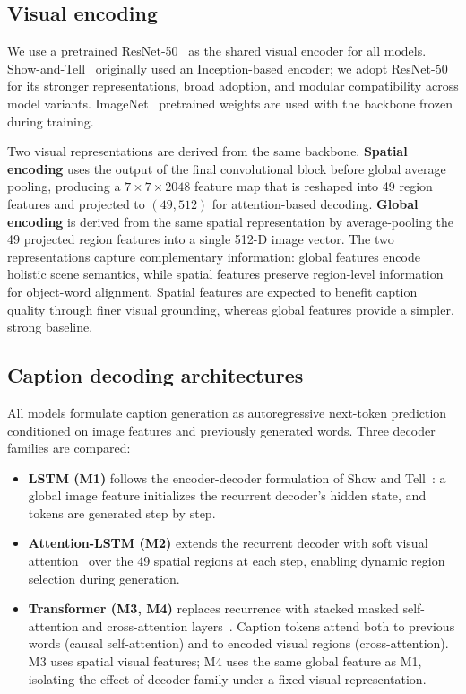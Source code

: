 \documentclass[10pt,twocolumn,letterpaper]{article}
\begin{document}
\subsection{Visual encoding}
We use a pretrained ResNet-50~\cite{he2016deep} as the shared visual
encoder for all models. Show-and-Tell~\cite{vinyals2015show} originally
used an Inception-based encoder; we adopt ResNet-50 for its stronger
representations, broad adoption, and modular compatibility across model
variants. ImageNet~\cite{deng2009imagenet} pretrained weights are used
with the backbone frozen during training.

Two visual representations are derived from the same backbone.
\textbf{Spatial encoding} uses the output of the final convolutional
block before global average pooling, producing a $7\times 7\times 2048$
feature map that is reshaped into 49 region features and projected to
$(49, 512)$ for attention-based decoding. \textbf{Global encoding} is
derived from the same spatial representation by average-pooling the 49
projected region features into a single 512-D image vector. The two
representations capture complementary information: global features
encode holistic scene semantics, while spatial features preserve
region-level information for object-word alignment. Spatial features
are expected to benefit caption quality through finer visual grounding,
whereas global features provide a simpler, strong baseline.

\subsection{Caption decoding architectures}
All models formulate caption generation as autoregressive
next-token prediction conditioned on image features and previously
generated words. Three decoder families are compared:

\begin{itemize}
    \item \textbf{LSTM (M1)} follows the encoder-decoder formulation
    of Show and Tell~\cite{vinyals2015show}: a global image feature
    initializes the recurrent decoder's hidden state, and tokens are
    generated step by step.
    \item \textbf{Attention-LSTM (M2)} extends the recurrent decoder
    with soft visual attention~\cite{xu2015show} over the 49 spatial
    regions at each step, enabling dynamic region selection during
    generation.
    \item \textbf{Transformer (M3, M4)} replaces recurrence with stacked
    masked self-attention and cross-attention layers~\cite{vaswani2017attention}.
    Caption tokens attend both to previous words (causal self-attention)
    and to encoded visual regions (cross-attention). M3 uses spatial
    visual features; M4 uses the same global feature as M1, isolating
    the effect of decoder family under a fixed visual representation.
\end{itemize}
\end{document}
